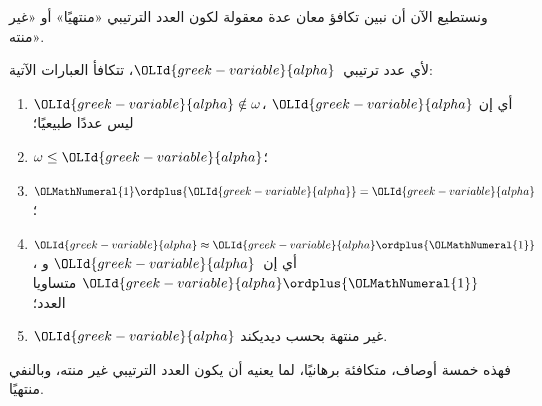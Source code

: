 \documentclass[../../../include/open-logic-section]{subfiles}
\begin{document}
ونستطيع الآن أن نبين تكافؤ معان عدة معقولة لكون العدد الترتيبي
«منتهيًا» أو «غير منته».

\begin{lem}
لأي عدد ترتيبي~${\OLId{greek-variable}{alpha}}$، تتكافأ العبارات الآتية:
\begin{enumerate}
	\item{} ${\OLId{greek-variable}{alpha}}\notin \omega$، أي إن
	${\OLId{greek-variable}{alpha}}$ ليس عددًا طبيعيًا؛
	\item{} $\omega \leq {\OLId{greek-variable}{alpha}}$؛
	\item{} ${\OLMathNumeral{1}} \ordplus {\OLId{greek-variable}{alpha}} = {\OLId{greek-variable}{alpha}}$؛
	\item{} ${\OLId{greek-variable}{alpha}} \approx {\OLId{greek-variable}{alpha}}\ordplus {\OLMathNumeral{1}}$، أي
	إن~${\OLId{greek-variable}{alpha}}$ و${\OLId{greek-variable}{alpha}}\ordplus {\OLMathNumeral{1}}$ متساويا العدد؛
	\item{} ${\OLId{greek-variable}{alpha}}$ غير منتهة بحسب ديديكند.
	\end{enumerate}
\end{lem}
\noindent
فهذه خمسة أوصاف، متكافئة برهانيًا، لما يعنيه أن يكون العدد الترتيبي
غير منته، وبالنفي منتهيًا.
\end{document}
